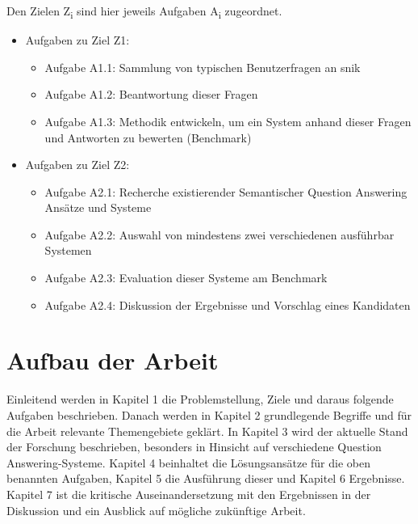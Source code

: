 Den Zielen Z\textsubscript{i} sind hier jeweils Aufgaben A\textsubscript{i} zugeordnet.

\begin{itemize}

	\item Aufgaben zu Ziel Z1:
	\begin{itemize}
		\item Aufgabe A1.1: Sammlung von typischen Benutzerfragen an \ac{snik}
		\item Aufgabe A1.2: Beantwortung dieser Fragen
		\item Aufgabe A1.3: Methodik entwickeln, um ein System anhand dieser Fragen und Antworten zu bewerten (Benchmark)
	\end{itemize}
	\item Aufgaben zu Ziel Z2:
	\begin{itemize}
		\item Aufgabe A2.1: Recherche existierender Semantischer Question Answering Ansätze und Systeme
		\item Aufgabe A2.2: Auswahl von mindestens zwei verschiedenen ausführbar Systemen
		\item Aufgabe A2.3: Evaluation dieser Systeme am Benchmark
		\item Aufgabe A2.4: Diskussion der Ergebnisse und Vorschlag eines Kandidaten
	\end{itemize}
\end{itemize}

\section{Aufbau der Arbeit}

Einleitend werden in Kapitel 1 die Problemstellung, Ziele und daraus folgende Aufgaben beschrieben.
Danach werden in Kapitel 2 grundlegende Begriffe und für die Arbeit relevante Themengebiete geklärt.
In Kapitel 3 wird der aktuelle Stand der Forschung beschrieben, besonders in Hinsicht auf verschiedene Question Answering-Systeme.
Kapitel 4 beinhaltet die Lösungsansätze für die oben benannten Aufgaben, Kapitel 5 die Ausführung dieser und Kapitel 6 Ergebnisse.
Kapitel 7 ist die kritische Auseinandersetzung mit den Ergebnissen in der Diskussion und ein Ausblick auf mögliche zukünftige Arbeit.
